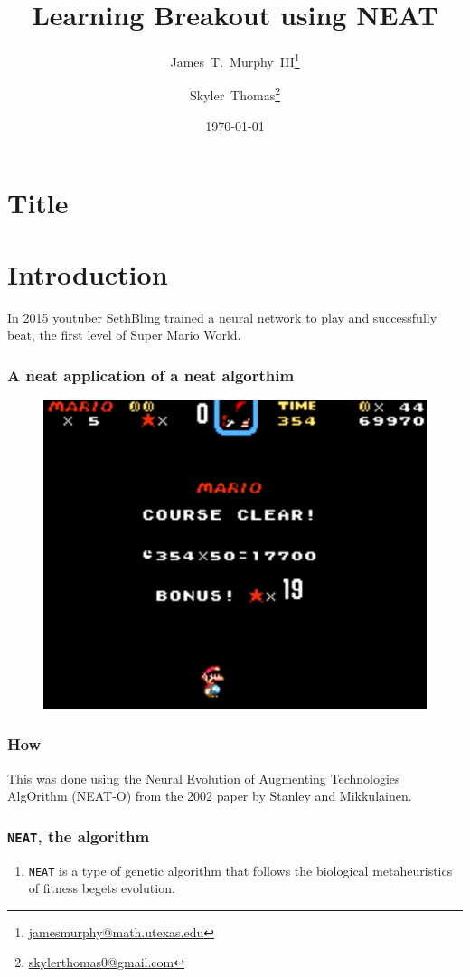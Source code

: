 \documentclass[t,pdflatex]{beamer}
\title{Learning Breakout using NEAT}
\author{James~T.~Murphy~III\thanks{\url{jamesmurphy@math.utexas.edu}}\and{}Skyler~Thomas\thanks{\url{skylerthomas0@gmail.com}}}
\institute{The University of Texas at Austin}
\date\today
\begin{document}
\section{Title}

    \begin{frame}

        \titlepage

    \end{frame}

\section{Introduction}
    \begin{frame}

        In 2015 youtuber SethBling trained a neural network to play and successfully beat, the first level of Super Mario World.
        \frametitle{A neat application of a neat algorthim}
        \begin{figure}
            \centering
            \includegraphics[width=.54 \textwidth]{mario.png}
        \end{figure}

    \end{frame}

    \begin{frame}

        \frametitle{How}
        This was done using the Neural Evolution of Augmenting Technologies AlgOrithm (NEAT-O) from the 2002 paper by Stanley and Mikkulainen.



    \end{frame}

    \begin{frame}

        \frametitle{\texttt{NEAT}, the algorithm}
        \begin{enumerate}[1]
            \item \texttt{NEAT} is a type of genetic algorithm that follows the biological metaheuristics of fitness begets evolution.

        \end{enumerate}

    \end{frame}
\end{document}
